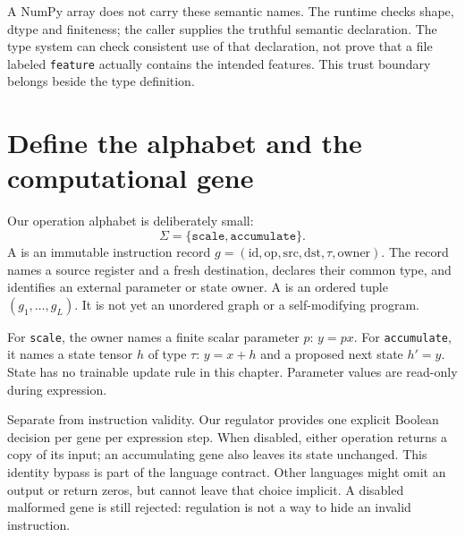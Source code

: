 

A NumPy array does not carry these semantic names. The runtime checks shape,
dtype and finiteness; the caller supplies the truthful semantic declaration.
The type system can check consistent use of that declaration, not prove
that a file labeled \texttt{feature} actually contains the intended features.
This trust boundary belongs beside the type definition.

\section{Define the alphabet and the computational gene}
Our operation alphabet is deliberately small:
\begin{equation}
 \Sigma=\{\texttt{scale},\texttt{accumulate}\}.
\end{equation}
A  is an immutable instruction record
$g=(\mathrm{id},\mathrm{op},\mathrm{src},\mathrm{dst},\tau,\mathrm{owner})$.
The record names a source register and a fresh destination, declares their
common type, and identifies an external parameter or state owner.
A  is an ordered tuple $(g_1,\ldots,g_L)$.
It is not yet an unordered graph or a self-modifying program.


For \texttt{scale}, the owner names a finite scalar parameter $p$:
$y=px$. For \texttt{accumulate}, it names a state tensor $h$ of type $\tau$:
$y=x+h$ and a proposed next state $h'=y$. State has no trainable update rule
in this chapter. Parameter values are read-only during expression.


Separate  from instruction validity. Our regulator provides
one explicit Boolean decision per gene per expression step. When disabled,
either operation returns a copy of its input; an accumulating gene also
leaves its state unchanged. This identity bypass is part of the language
contract. Other languages might omit an output or return zeros, but cannot
leave that choice implicit. A disabled malformed gene is still rejected:
regulation is not a way to hide an invalid instruction.

